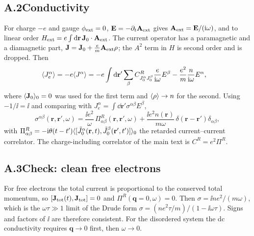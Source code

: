 \subsection*{A.2\quad Conductivity}
For charge $-e$ and gauge $\phi_{\rm ext}=0$, $\mathbf{E}=-\partial_t\mathbf{A}_{\rm ext}$ gives $\mathbf{A}_{\rm ext}=\mathbf{E}/(\mathrm{i}\omega)$, and to linear order $H_{\rm ext}=e\int\mathrm{d}\mathbf{r}\,\mathbf{J}_0\cdot\mathbf{A}_{\rm ext}$. The current operator has a paramagnetic and a diamagnetic part, $\mathbf{J}=\mathbf{J}_0+\frac em\mathbf{A}_{\rm ext}\rho$; the $A^2$ term in $H$ is second order and is dropped. Then
\begin{align}
\langle J_e^\alpha \rangle=-e\langle J^\alpha \rangle
&=-e\int\mathrm{d}\mathbf{r}'\sum_\beta C^R_{J_0^\alpha J_0^\beta}\frac{e}{\mathrm{i}\omega}E^\beta-\frac{e^2}{m}\frac{n}{\mathrm{i}\omega}E^\alpha ,
\end{align}
where $\langle \mathbf{J}_0 \rangle_0=0$ was used for the first term and $\langle \rho \rangle\to n$ for the second. Using $-1/\ii=\ii$ and comparing with $J_e^\alpha=\int\dd\mathbf{r}'\sigma^{\alpha\beta}E^\beta$,
\begin{equation}
\boxed{\sigma^{\alpha\beta}(\mathbf{r},\mathbf{r}',\omega)=\frac{\ii e^2}{\omega}\,\Pi^R_{\alpha\beta}(\mathbf{r},\mathbf{r}',\omega)+\frac{\ii e^2n(\mathbf{r})}{m\omega}\,\delta(\mathbf{r}-\mathbf{r}')\delta_{\alpha\beta}},
\label{eq:Ksigma}
\end{equation}
with $\Pi^R_{\alpha\beta}=-\mathrm{i}\theta(t-t')\langle [\tilde J_0^\alpha(\mathbf{r},t),\tilde J_0^\beta(\mathbf{r}',t')] \rangle_0$ the retarded current--current correlator. The charge-including correlator of the main text is $C^R=e^2\Pi^R$.

\subsection*{A.3\quad Check: clean free electrons}
For free electrons the total current is proportional to the conserved total momentum, so $[\mathbf{J}_{\rm tot}(t),\mathbf{J}_{\rm tot}]=0$ and $\Pi^R(\mathbf{q}=0,\omega)=0$. Then $\sigma=\ii ne^2/(m\omega)$, which is the $\omega\tau\gg1$ limit of the Drude form $\sigma=(ne^2\tau/m)/(1-\ii\omega\tau)$. Signs and factors of $\ii$ are therefore consistent. For the disordered system the dc conductivity requires $\mathbf{q}\to0$ first, then $\omega\to0$.
